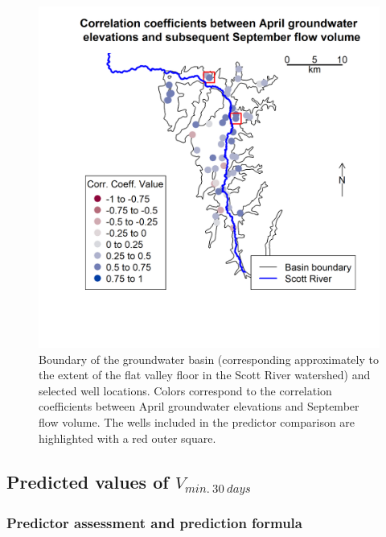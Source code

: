 \documentclass[
]{article}
\begin{document}
\begin{figure}
\includegraphics[width=1\linewidth]{f09} \caption{\label{fig:gw_vs_fall_flows_corr_map} Boundary of the groundwater basin (corresponding approximately to the extent of the flat valley floor in the Scott River watershed) and selected well locations. Colors correspond to the correlation coefficients between April groundwater elevations and September flow volume. The wells included in the predictor comparison are highlighted with a red outer square.}\label{fig:gw_vs_fall_flows_corr_map}
\end{figure}

\hypertarget{predicted-values-of-v_min.30days}{%
\subsection{\texorpdfstring{Predicted values of
\(V_{min.~30~days}\)}{Predicted values of V\_\{min.\textasciitilde30\textasciitilde days\}}}\label{predicted-values-of-v_min.30days}}

\hypertarget{predictor-assessment-and-prediction-formula}{%
\subsubsection{Predictor assessment and prediction
formula}\label{predictor-assessment-and-prediction-formula}}
\end{document}
